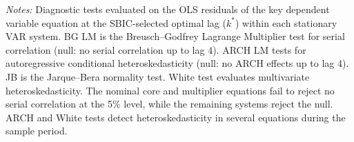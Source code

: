 \begin{table}[htbp]
\centering
\small
\renewcommand{\arraystretch}{0.92}
\caption{Diagnostic Test Battery on System Residuals at Optimal Lags ($k^*$)}
\label{tab:residual_diagnostics}
\begin{minipage}{0.96\textwidth}
\vspace{0.3em}
\footnotesize \textit{Notes:} Diagnostic tests evaluated on the OLS residuals of the key dependent variable equation at the SBIC-selected optimal lag ($k^*$) within each stationary VAR system. BG LM is the Breusch--Godfrey Lagrange Multiplier test for serial correlation (null: no serial correlation up to lag 4). ARCH LM tests for autoregressive conditional heteroskedasticity (null: no ARCH effects up to lag 4). JB is the Jarque--Bera normality test. White test evaluates multivariate heteroskedasticity. The nominal core and multiplier equations fail to reject no serial correlation at the 5\% level, while the remaining systems reject the null. ARCH and White tests detect heteroskedasticity in several equations during the sample period.
\end{minipage}
\end{table}
